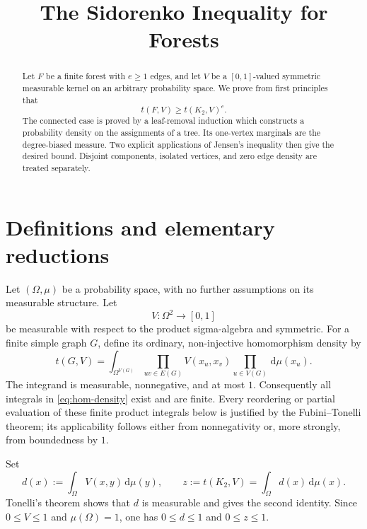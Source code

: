\documentclass[11pt]{article}
\title{The Sidorenko Inequality for Forests}
\author{}
\date{}
\newcommand{\dd}{\,\mathrm{d}}
\begin{document}
\maketitle

\begin{abstract}
Let $F$ be a finite forest with $e\geq 1$ edges, and let $V$ be a
$[0,1]$-valued symmetric measurable kernel on an arbitrary probability
space.  We prove from first principles that
\[
t(F,V)\geq t(K_2,V)^e.
\]
The connected case is proved by a leaf-removal induction which constructs
a probability density on the assignments of a tree.  Its one-vertex
marginals are the degree-biased measure.  Two explicit applications of
Jensen's inequality then give the desired bound.  Disjoint components,
isolated vertices, and zero edge density are treated separately.
\end{abstract}


\section{Definitions and elementary reductions}

Let $(\Omega,\mu)$ be a probability space, with no further assumptions
on its measurable structure.  Let
\[
V\colon \Omega^2\longrightarrow[0,1]
\]
be measurable with respect to the product sigma-algebra and symmetric.
For a finite simple graph $G$, define its ordinary, non-injective
homomorphism density by
\begin{equation}
t(G,V)
=
\int_{\Omega^{V(G)}}
\prod_{uv\in E(G)}V(x_u,x_v)
\prod_{u\in V(G)}\dd\mu(x_u).
\label{eq:hom-density}
\end{equation}
The integrand is measurable, nonnegative, and at most $1$.  Consequently
all integrals in \eqref{eq:hom-density} exist and are finite.  Every
reordering or partial evaluation of these finite product integrals below
is justified by the Fubini--Tonelli theorem; its applicability follows
either from nonnegativity or, more strongly, from boundedness by $1$.

Set
\begin{equation}
d(x):=\int_\Omega V(x,y)\dd\mu(y),
\qquad
z:=t(K_2,V)=\int_\Omega d(x)\dd\mu(x).
\label{eq:degree}
\end{equation}
Tonelli's theorem shows that $d$ is measurable and gives the second
identity.  Since $0\leq V\leq1$ and $\mu(\Omega)=1$, one has
$0\leq d\leq1$ and $0\leq z\leq1$.
\end{document}
